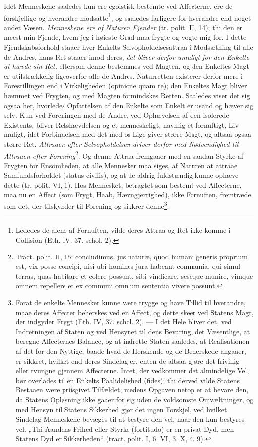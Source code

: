 \documentclass[12pt,a4paper]{book}
\newcommand{\opage}[1]{\marginnote{\footnotesize\textit{[#1]}}}
\begin{document}
Idet Menneskene saaledes kun ere egoistisk bestemte ved Affecterne, ere de forskjellige og hverandre modsatte\footnote{Lededes de alene af Fornuften, vilde deres Attraa og Ret ikke komme i Collision (Eth. IV. 37. schol. 2).}, og saaledes farligere for hverandre end noget andet Væsen. \emph{Menneskene ere af Naturen Fjender} (tr. polit. II, 14); thi den er meest min Fjende, hvem jeg i høieste Grad maa frygte og vogte mig for. I dette Fjendskabsforhold staaer hver Enkelts Selvopholdelsesattraa i Modsætning til alle de Andres, hans Ret staaer imod deres, \emph{det bliver derfor umuligt for den Enkelte at hævde sin Ret,} eftersom denne bestemmes ved Magten, og den Enkeltes Magt er
\opage{136} \setcounter{footnote}{0}%
utilstrækkelig ligeoverfor alle de Andres. Naturretten existerer derfor mere i Forestillingen end i Virkeligheden (opinione quam re); den Enkeltes Magt bliver hæmmet ved Frygten, og med Magten formindskes Retten. Saaledes viser det sig ogsaa her, hvorledes Opfattelsen af den Enkelte som Enkelt er usand og hæver sig selv. Kun ved Foreningen med de Andre, ved Ophævelsen af den isolerede Existents, bliver Retshævdelsen og et menneskeligt, navnlig et fornuftigt, Liv muligt, idet Forbindelsen med det med os Lige giver større Magt, og altsaa ogsaa større Ret. \emph{Attraaen efter Selvopholdelsen driver derfor med Nødvendighed til Attraaen efter Forening}\footnote{Tract. polit. II, 15: concludimus, jus naturæ, quod humani generis proprium est, vix posse concipi, nisi ubi homines jura habeant communia, qui simul terras, quas habitare et colere possunt, sibi vindicare, seseque munire, vimque omnem repellere et ex communi omnium sententia vivere possunt.}. Og denne Attraa fremgaaer med en saadan Styrke af Frygten for Ensomheden, at alle Mennesker maa siges, af Naturen at attraae Samfundsforholdet (status civilis), og at de aldrig fuldstændig kunne ophæve dette (tr. polit. VI, 1). Hos Mennesket, betragtet som bestemt ved Affecterne, maa nu en Affect (som Frygt, Haab, Hævngjerrighed), ikke Fornuften, fremtræde som det, der tilskynder til Forening og sikkrer denne\footnote{Forat de enkelte Mennesker kunne være trygge og have Tillid til hverandre, maae deres Affecter beherskes ved en Affect, og dette skeer ved Statens Magt, der indgyder Frygt (Eth. IV, 37. schol. 2). --- I det Hele bliver det, ved Indretningen af Staten og ved Hensynet til dens Bevaring, det Væsentlige, at beregne Affecternes Balance, og at indrette Staten saaledes, at Realisationen af det for den Nyttige, baade hvad de Herskende og de Beherskede angaaer, er sikkret, hvilket end deres Sindelag er, enten de altsaa gjøre det frivillig eller tvungne gjennem Affecterne. Intet, der vedkommer det almindelige Vel, bør overlades til en Enkelts Paalidelighed (fides); thi derved vilde Statens Bestaaen være priisgivet Tilfældet, medens Opgaven netop er at bevare den, da Statens Opløsning ikke gaaer for sig uden de voldsomste Omvæltninger, og med Hensyn til Statens Sikkerhed gjør det ingen Forskjel, ved hvilket Sindelag Menneskene bevæges til at bestyre den vel, naar den kun bestyres vel. „Thi Aandens Frihed eller Styrke (fortitudo) er en privat Dyd, men Statens Dyd er Sikkerheden“ (tract. polit. I, 6. VI, 3. X, 4. 9).}.
\end{document}
